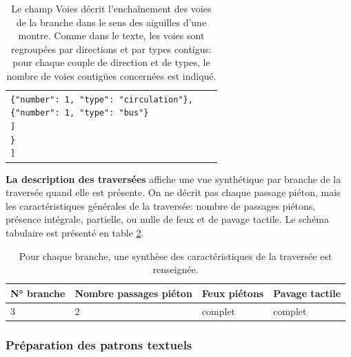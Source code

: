\begin{table}[ht]
\begin{center}
\begin{tabular}{ | l | l | l |}
{                \hspace{1.5cm}\texttt{\{"number": 1, "type": "circulation"\},}\\
                \hspace{1.5cm}\texttt{\{"number": 1, "type": "bus"\}}\\
                \hspace{1cm}\texttt{]}\\
                \hspace{0.5cm}\texttt{\}}\\
                \texttt]
            }
        \end{tabular}
    \end{center}
    \caption[Schéma tabulaire de la description des branches]{Le champ Voies décrit l'enchaînement des voies de la branche dans le sens des aiguilles d'une montre. Comme dans le texte, les voies sont regroupées par directions et par types contigus: pour chaque couple de direction et de types, le nombre de voies contigües concernées est indiqué.}
    \label{tab:experimentation_desc_branches}
\end{table}

\newpar{}

\textbf{La description des traversées} affiche une vue synthétique par branche de la traversée quand elle est présente. On ne décrit pas chaque passage piéton, mais les caractéristiques générales de la traversée: nombre de passages piétons, présence intégrale, partielle, ou nulle de feux et de pavage tactile. Le schéma tabulaire est présenté en table \ref{tab:experimentation_desc_traversées}.

\newpar{}

\begin{table}[ht]
    \begin{center}
        \footnotesize
        \begin{tabular}{ | l | l | l | l | }
            \textbf{N° branche} & \textbf{Nombre passages piéton} & \textbf{Feux piétons} & \textbf{Pavage tactile}\tabularnewline
            \hline
            3 & 2 & complet & complet
        \end{tabular}
    \end{center}
    \caption[Schéma tabulaire de la description des traversées]{Pour chaque branche, une synthèse des caractéristiques de la traversée est renseignée.}
    \label{tab:experimentation_desc_traversées}
\end{table}

\subsubsection{Préparation des patrons textuels}

